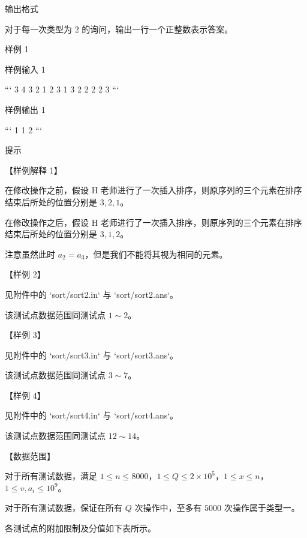 \documentclass[12pt,twiside,a4paper]{ctexbook}
\numberwithin{chapter}{part}
\begin{document}
 输出格式

对于每一次类型为 $2$ 的询问，输出一行一个正整数表示答案。

 样例 1

 样例输入 1

```
3 4
3 2 1
2 3
1 3 2
2 2
2 3
```

 样例输出 1

```
1
1
2
```

 提示

【样例解释 1】

在修改操作之前，假设 H 老师进行了一次插入排序，则原序列的三个元素在排序结束后所处的位置分别是 $3, 2, 1$。

在修改操作之后，假设 H 老师进行了一次插入排序，则原序列的三个元素在排序结束后所处的位置分别是 $3, 1, 2$。

注意虽然此时 $a_2 = a_3$，但是我们不能将其视为相同的元素。

【样例 2】

见附件中的 `sort/sort2.in` 与 `sort/sort2.ans`。

该测试点数据范围同测试点 $1 \sim 2$。

【样例 3】

见附件中的 `sort/sort3.in` 与 `sort/sort3.ans`。

该测试点数据范围同测试点 $3 \sim 7$。

【样例 4】

见附件中的 `sort/sort4.in` 与 `sort/sort4.ans`。

该测试点数据范围同测试点 $12 \sim 14$。

【数据范围】

对于所有测试数据，满足 $1 \le n \le 8000$，$1 \le Q \le 2 \times {10}^5$，$1 \le x \le n$，$1 \le v,a_i \le 10^9$。

对于所有测试数据，保证在所有 $Q$ 次操作中，至多有 $5000$ 次操作属于类型一。

各测试点的附加限制及分值如下表所示。
\end{document}
